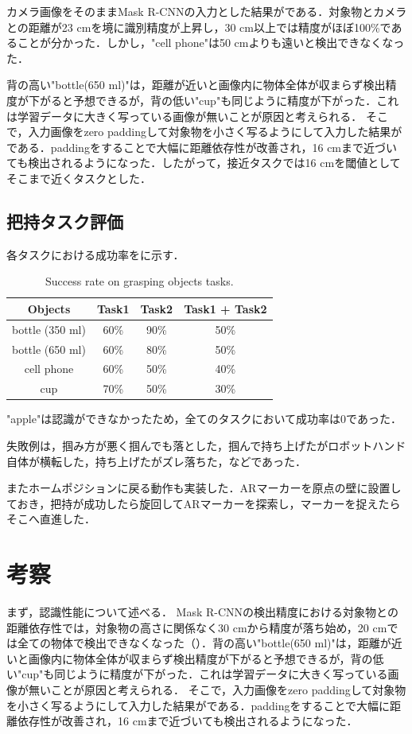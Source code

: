 カメラ画像をそのままMask R-CNNの入力とした結果がである．対象物とカメラとの距離が23 cmを境に識別精度が上昇し，30 cm以上では精度がほぼ100\%であることが分かった．しかし，"cell phone"は50 cmよりも遠いと検出できなくなった．

背の高い"bottle(650 ml)"は，距離が近いと画像内に物体全体が収まらず検出精度が下がると予想できるが，背の低い"cup"も同じように精度が下がった．これは学習データに大きく写っている画像が無いことが原因と考えられる．
そこで，入力画像をzero paddingして対象物を小さく写るようにして入力した結果がである．paddingをすることで大幅に距離依存性が改善され，16 cmまで近づいても検出されるようになった．したがって，接近タスクでは16 cmを閾値としてそこまで近くタスクとした．

\subsection{把持タスク評価}
各タスクにおける成功率をに示す．
\begin{table}[H]
    \centering
    \caption{Success rate on grasping objects tasks.}
    \begin{tabular}{cccc}\toprule
        Objects & Task1 & Task2 & Task1 + Task2 \\ \midrule
        bottle (350 ml) & 60\% & 90\% & 50\% \\
        bottle (650 ml) & 60\% & 80\% & 50\% \\
        cell phone & 60\% & 50\% & 40\% \\ 
        cup & 70\% & 50\% & 30\% \\ \bottomrule
    \end{tabular} 
    \label{tab:把持成功率}
\end{table}
"apple"は認識ができなかったため，全てのタスクにおいて成功率は0であった．

失敗例は，掴み方が悪く掴んでも落とした，掴んで持ち上げたがロボットハンド自体が横転した，持ち上げたがズレ落ちた，などであった．

またホームポジションに戻る動作も実装した．ARマーカーを原点の壁に設置しておき，把持が成功したら旋回してARマーカーを探索し，マーカーを捉えたらそこへ直進した．


\section{考察}
まず，認識性能について述べる．
Mask R-CNNの検出精度における対象物との距離依存性では，対象物の高さに関係なく30 cmから精度が落ち始め，20 cmでは全ての物体で検出できなくなった（）．背の高い"bottle(650 ml)"は，距離が近いと画像内に物体全体が収まらず検出精度が下がると予想できるが，背の低い"cup"も同じように精度が下がった．これは学習データに大きく写っている画像が無いことが原因と考えられる．
そこで，入力画像をzero paddingして対象物を小さく写るようにして入力した結果がである．paddingをすることで大幅に距離依存性が改善され，16 cmまで近づいても検出されるようになった．

